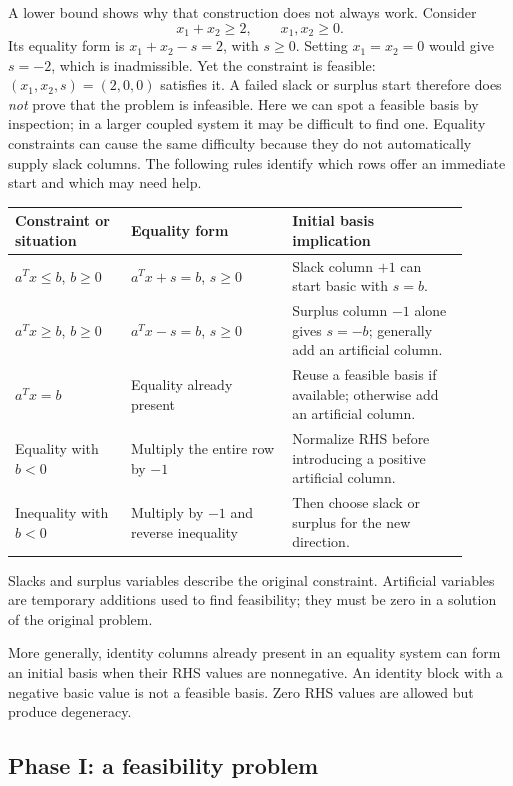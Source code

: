\documentclass[11pt,a4paper]{article}
\begin{document}
A lower bound shows why that construction does not always work. Consider
\[
  x_1+x_2\geq2,\qquad x_1,x_2\geq0.
\]
Its equality form is $x_1+x_2-s=2$, with $s\geq0$. Setting $x_1=x_2=0$
would give $s=-2$, which is inadmissible. Yet the constraint is feasible:
$(x_1,x_2,s)=(2,0,0)$ satisfies it. A failed slack or surplus start therefore
does \emph{not} prove that the problem is infeasible. Here we can spot a
feasible basis by inspection; in a larger coupled system it may be difficult
to find one. Equality constraints can cause the same difficulty because they
do not automatically supply slack columns. The following rules identify
which rows offer an immediate start and which may need help.
\begin{center}
  \begin{tabular}{>{\raggedright\arraybackslash}p{0.23\linewidth}>{\raggedright\arraybackslash}p{0.32\linewidth}>{\raggedright\arraybackslash}p{0.35\linewidth}}\toprule
    Constraint or situation & Equality form & Initial basis implication\\\midrule
    $a^Tx\leq b$, $b\geq0$ & $a^Tx+s=b$, $s\geq0$ & Slack column $+1$ can start basic with $s=b$.\\
    $a^Tx\geq b$, $b\geq0$ & $a^Tx-s=b$, $s\geq0$ & Surplus column $-1$ alone gives $s=-b$; generally add an artificial column.\\
    $a^Tx=b$ & Equality already present & Reuse a feasible basis if available; otherwise add an artificial column.\\
    Equality with $b<0$ & Multiply the entire row by $-1$ & Normalize RHS before introducing a positive artificial column.\\
    Inequality with $b<0$ & Multiply by $-1$ and reverse inequality & Then choose slack or surplus for the new direction.\\\bottomrule
  \end{tabular}
\end{center}
Slacks and surplus variables describe the original constraint. Artificial
variables are temporary additions used to find feasibility; they must be zero
in a solution of the original problem.

More generally, identity columns already present in an equality system can form
an initial basis when their RHS values are nonnegative. An identity block with
a negative basic value is not a feasible basis. Zero RHS values are allowed but
produce degeneracy.

\subsection{Phase I: a feasibility problem}\label{sec:phase-one}
\end{document}

